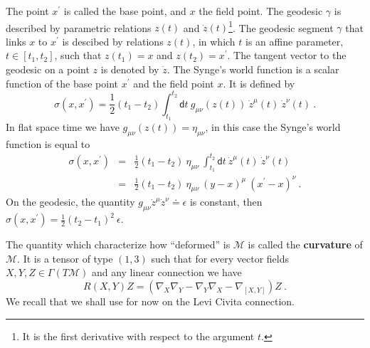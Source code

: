 \documentclass[10pt]{book}
\let\int\int
\newcommand{\Mcal}{\mathcal{M}}
\newcommand{\dsf}{\mathsf{d}}
\theoremstyle{break}
\begin{document}
The point $x^\prime$ is called the base point, and $x$ the field point. The geodesic $\gamma$ is described by parametric relations $z(t)$ and $\dot{z}(t)$\footnote{It is the first derivative with respect to the argument $t$.}.
The geodesic segment $\gamma$ that links $x$ to $x^\prime$ is descibed by relations $z(t)$, in which $t$ is an affine parameter, $t \in \left[ t_1 , t_2 \right]$, such that $z(t_1) = x$ and $z(t_2) = x^\prime$. The tangent vector to the geodesic on a point $z$ is denoted by $\dot{z}$. The Synge's world function is a scalar function of the base point $x^\prime$ and the field point $x$. It is defined by
%
\begin{equation*}
\sigma(x,x^\prime) =  \frac{1}{2} (t_1 - t_2) \int_{t_1}^{t_2} \dsf t \ g_{\mu \nu} \left( z(t) \right) \ \dot{z}^\mu(t) \ \dot{z}^{\nu}(t) \ .
\end{equation*}
%
In flat space time we have $g_{\mu \nu} \left( z(t) \right) = \eta_{\mu \nu}$, in this case the Synge's world function is equal to
%
\begin{eqnarray*}
\sigma(x,x^\prime) &=& \frac{1}{2} (t_1 - t_2) \ \eta_{\mu \nu} \ \int_{t_1}^{t_2} \dsf t \ \dot{z}^\mu(t) \ \dot{z}^{\nu}(t) \\
&=& \frac{1}{2} (t_1 - t_2) \ \eta_{\mu \nu} \ (y-x)^\mu \ (x^\prime-x)^\nu \ .
\end{eqnarray*}
%
On the geodesic, the quantity $g_{\mu \nu} \dot{z}^\mu \dot{z}^\nu \doteq \epsilon$ is constant, then $\sigma(x,x^\prime) = \frac{1}{2} (t_2-t_1)^2 \ \epsilon$.


\bigskip

The quantity which characterize how ``deformed'' is $\Mcal$ is called the \textbf{curvature} of $\Mcal$. It is a tensor of type $(1,3)$ such that for every vector fields $X, Y, Z \in \Gamma(T\Mcal)$ and any linear connection we have
%
\begin{equation*}
R(X,Y)Z = \left( \nabla_X \nabla_Y - \nabla_Y \nabla_X - \nabla_{[X,Y]} \right) Z \ .
\end{equation*}
%
We recall that we shall use for now on the Levi Civita connection. %
%
%
\end{document}
